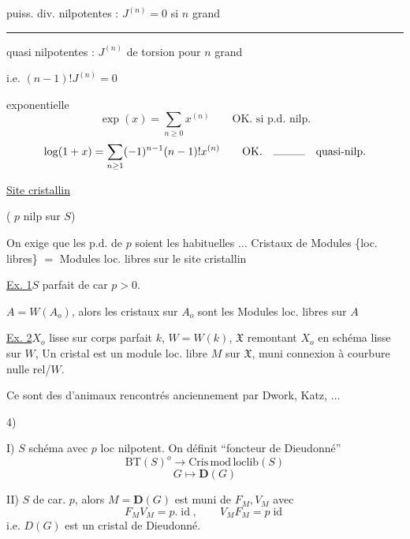 puiss. div. nilpotentes : $J^{(n)}=0$ si $n$ grand

\rule{2cm}{.3pt} quasi nilpotentes : $J^{(n)}$ de torsion pour $n$ grand

i.e. $(n-1)!J^{(n)}=0$

exponentielle
\[
\exp(x)=\sum_{n\geq0}x^{(n)}\qquad\text{OK. si p.d. nilp.}
\]
\[
\log(1+x)=\sum_{n\geq1}(-1)^{n-1}(n-1)!x^{(n)}\qquad\text{OK.}\quad\rule{1cm}{.3pt}\quad\text{quasi-nilp.}
\]

\uline{Site cristallin}  \quad{}

 ( $p$ nilp sur $S$)

On exige que les p.d. de $p$ soient les habituelles $\ldots$
Cristaux de Modules \{loc. libres\} $=$ Modules loc. libres sur le site cristallin

\uline{Ex. 1}\quad $S$   parfait de car $p>0$.

$A=W(A_o)$, alors les cristaux sur $A_o$ sont les Modules loc. libres sur $A$

\uline{Ex. 2}\quad $X_o$ lisse sur corps parfait $k$, $W=W(k)$,
$\mathfrak X$ remontant $X_o$ en schéma  lisse sur $W$,
Un cristal est un module loc. libre $M$ sur $\mathfrak X$, muni connexion à courbure nulle rel/$W$.

Ce sont des  d'animaux  rencontrés anciennement par Dwork, Katz, $\ldots$

4)

I) $S$ schéma avec $p$ loc nilpotent. On définit ``foncteur de Dieudonné''
\[
\mathrm{BT}(S)^o\longrightarrow\mathrm{Cris}\,\mathrm{mod}\,\mathrm{loclib}(S)
\]
\[
G\longmapsto\mathbf D(G)
\]

II)  $S$ de car. $p$, alors $M=\mathbf D(G)$ est muni de $F_M,V_M$ avec
\[
F_MV_M=p.\operatorname{id},\qquad V_MF_M=p\operatorname{id}
\]
i.e. $D(G)$ est un cristal de Dieudonné.

